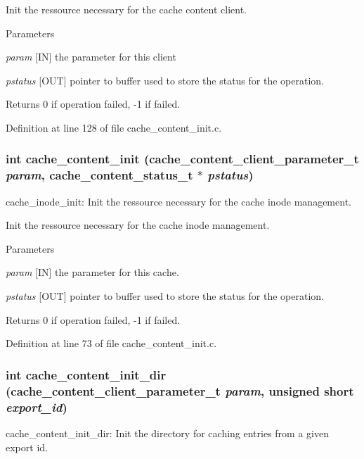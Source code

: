 Init the ressource necessary for the cache content client.


\begin{DoxyParams}{Parameters}
\item[{\em param}][IN] the parameter for this client \item[{\em pstatus}][OUT] pointer to buffer used to store the status for the operation.\end{DoxyParams}
\begin{DoxyReturn}{Returns}
0 if operation failed, -\/1 if failed. 
\end{DoxyReturn}


Definition at line 128 of file cache\_\-content\_\-init.c.
\subsubsection[{cache\_\-content\_\-init}]{\setlength{\rightskip}{0pt plus 5cm}int cache\_\-content\_\-init (cache\_\-content\_\-client\_\-parameter\_\-t {\em param}, \/  cache\_\-content\_\-status\_\-t $\ast$ {\em pstatus})}\label{cache__content__init_8c_a24a42a2805937468b2828d2835f52050}
cache\_\-inode\_\-init: Init the ressource necessary for the cache inode management.

Init the ressource necessary for the cache inode management.


\begin{DoxyParams}{Parameters}
\item[{\em param}][IN] the parameter for this cache. \item[{\em pstatus}][OUT] pointer to buffer used to store the status for the operation.\end{DoxyParams}
\begin{DoxyReturn}{Returns}
0 if operation failed, -\/1 if failed. 
\end{DoxyReturn}


Definition at line 73 of file cache\_\-content\_\-init.c.
\subsubsection[{cache\_\-content\_\-init\_\-dir}]{\setlength{\rightskip}{0pt plus 5cm}int cache\_\-content\_\-init\_\-dir (cache\_\-content\_\-client\_\-parameter\_\-t {\em param}, \/  unsigned short {\em export\_\-id})}\label{cache__content__init_8c_ad776d12ad1a4a6efc8ff8246c26d0572}
cache\_\-content\_\-init\_\-dir: Init the directory for caching entries from a given export id.



